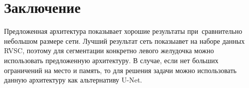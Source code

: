 \section{Заключение}

Предложенная архитектура показывает хорошие результаты при~сравнительно небольшом размере сети. Лучший результат сеть показыавет на наборе данных RVSC, поэтому для сегментации конкретно левого желудочка можно использовать предложенную архитектуру. В случае, если нет больших ограничений на место и память, то для решения задачи можно использовать данную архитектуру как альтернативу U-Net.


